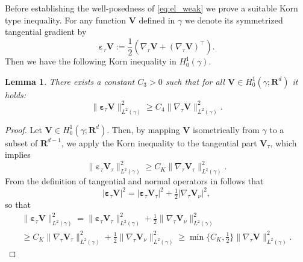 \documentclass[a4paper]{article}
\newtheorem{lemma}[theorem]{Lemma}
\def\ep{\vc\varepsilon}
\def\norm#1{\|#1\|}
\def\Real{{\mathbf R}}
\def\V{\vc V}
\def\vc#1{\mathbf{\boldsymbol{#1}}}     %
\newcommand{\eq}[1]{\begin{equation}#1\end{equation}}
\newcommand{\ml}[1]{\begin{multline}#1\end{multline}}
\begin{document}
Before establishing the well-posedness of \eqref{eq:el_weak} we prove a suitable Korn type inequality.
For any function $\V$ defined in $\gamma$ we denote its symmetrized tangential gradient by
\eq{ \ep_\tau\V := \frac12(\nabla_\tau\V+(\nabla_\tau\V)^\top). }
Then we have the following Korn inequality in $H^1_0(\gamma)$.
% 
\begin{lemma}\label{th:korn_tau}
There exists a constant $C_3>0$ such that for all $\V\in H^1_0(\gamma;\Real^d)$ it holds:
\eq{ \norm{\ep_\tau\V}_{L^2(\gamma)}^2 \ge C_4\norm{\nabla_\tau\V}_{L^2(\gamma)}^2. }
\end{lemma}
% 
\begin{proof}
Let $\V\in H^1_0(\gamma;\Real^d)$.
Then, by mapping $\V$ isometrically from $\gamma$ to a subset of $\Real^{d-1}$, we apply the Korn inequality to the tangential part $\V_\tau$, which implies
\eq{ \norm{\ep_\tau\V_\tau}_{L^2(\gamma)}^2 \ge C_K\norm{\nabla_\tau\V_\tau}_{L^2(\gamma)}^2. }
From the definition of tangential and normal operators in follows that
\eq{ |\ep_\tau\V|^2 = |\ep_\tau\V_\tau|^2 + \tfrac12|\nabla_\tau\V_\nu|^2, }
so that
\ml{ \norm{\ep_\tau\V}_{L^2(\gamma)}^2 = \norm{\ep_\tau\V_\tau}_{L^2(\gamma)}^2 + \tfrac12\norm{\nabla_\tau\V_\nu}_{L^2(\gamma)}^2\\
\ge C_K\norm{\nabla_\tau\V_\tau}_{L^2(\gamma)}^2 + \tfrac12\norm{\nabla_\tau\V_\nu}_{L^2(\gamma)}^2 \ge \min\{C_K,\tfrac12\}\norm{\nabla_\tau\V}_{L^2(\gamma)}^2. }
\end{proof}
\end{document}
